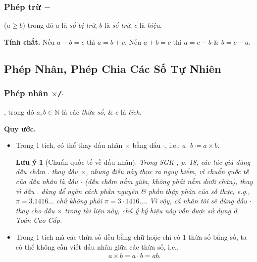 \documentclass{article}
\numberwithin{equation}{section}
\newtheorem{remark}{Lưu ý}[section]
\begin{document}
\subsubsection{Phép trừ $-$}
 ($a\ge b$) trong đó $a$ là \textit{số bị trừ}, $b$ là \textit{số trừ}, $c$ là \textit{hiệu}.

\noindent\textbf{Tính chất.} Nếu $a - b = c$ thì $a = b + c$. Nếu $a + b = c$ thì $a = c - b$ \& $b = c - a$.

\subsection{Phép Nhân, Phép Chia Các Số Tự Nhiên}

\subsubsection{Phép nhân $\times$\texttt{/}$\cdot$}
, trong đó $a,b\in\mathbb{N}$ là các \textit{thừa số}, \& $c$ là \textit{tích}.

\noindent\textbf{Quy ước.}
\begin{itemize}
	\item Trong 1 tích, có thể thay dấu nhân $\times$ bằng dấu $\cdot$, i.e., $a\cdot b\coloneqq a\times b$.
	
	\begin{remark}[Chuẩn quốc tế về dấu nhân]
		Trong SGK \cite{Toan6}, p. 18, các tác giả dùng dấu chấm $.$ thay dấu $\times$, nhưng điều này thực ra nguy hiểm, vì chuẩn quốc tế của dấu nhân là dấu $\cdot$ (dấu chấm nằm giữa, không phải nằm dưới chân), thay vì dấu $.$ dùng để ngăn cách phần nguyên \& phần thập phân của số thực, e.g., $\pi = 3.1416\ldots$ chứ không phải $\pi = 3\cdot 1416\ldots$. Vì vậy, cá nhân tôi sẽ dùng dấu $\cdot$ thay cho dấu $\times$ trong tài liệu này, chú ý ký hiệu này vẫn được sử dụng ở Toán Cao Cấp.
	\end{remark}
	\item Trong 1 tích mà các thừa số đều bằng chữ hoặc chỉ có 1 thừa số bằng số, ta có thể không cần viết dấu nhân giữa các thừa số, i.e.,
	\begin{align*}
		a\times b = a\cdot b = ab.
	\end{align*}
\end{itemize}
\end{document}
